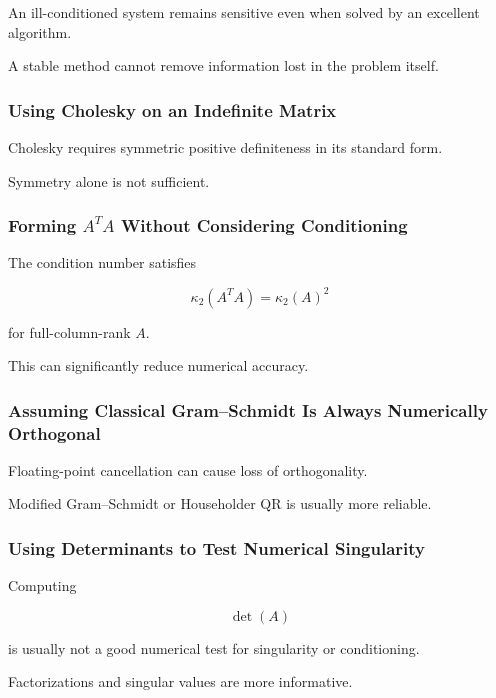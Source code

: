 An ill-conditioned system remains sensitive even when solved by an
excellent algorithm.

A stable method cannot remove information lost in the problem itself.

\subsubsection{Using Cholesky on an Indefinite Matrix}

Cholesky requires symmetric positive definiteness in its standard form.

Symmetry alone is not sufficient.

\subsubsection{Forming \(A^TA\) Without Considering Conditioning}

The condition number satisfies

\[
\boxed{
\kappa_2(A^TA)
=
\kappa_2(A)^2
}
\]

for full-column-rank \(A\).

This can significantly reduce numerical accuracy.

\subsubsection{Assuming Classical Gram--Schmidt Is Always Numerically Orthogonal}

Floating-point cancellation can cause loss of orthogonality.

Modified Gram--Schmidt or Householder QR is usually more reliable.

\subsubsection{Using Determinants to Test Numerical Singularity}

Computing

\[
\det(A)
\]

is usually not a good numerical test for singularity or conditioning.

Factorizations and singular values are more informative.

